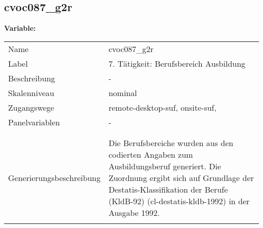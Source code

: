 	
	
	\subsection{cvoc087\_g2r}
	\label{subSection:cvoc087_g2r}

	\noindent\textbf{Variable:}\\
		\begin{tabular}{lL{11.3cm}}
			\label{tableVariable:cvoc087_g2r}
			Name & cvoc087\_g2r \\
			Label & 7. Tätigkeit: Berufsbereich Ausbildung \\
			Beschreibung & - \\
			Skalenniveau & nominal \\
			Zugangswege &
				remote-desktop-suf,
				onsite-suf,
 \\
			Panelvariablen & -
			 \\
			 \\
 \\
					Generierungsbeschreibung & Die Berufsbereiche wurden aus den codierten Angaben zum Ausbildungsberuf generiert. Die Zuordnung ergibt sich auf Grundlage der Destatis-Klassifikation der Berufe (KldB-92) (cl-destatis-kldb-1992) in der Ausgabe 1992. 
				 \\	
			 \\
		\end{tabular}






